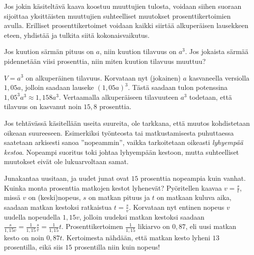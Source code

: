 Jos jokin käsiteltävä kaava koostuu muuttujien tulosta, voidaan siihen suoraan sijoittaa yksittäisten muuttujien suhteelliset muutokset prosenttikertoimien avulla. Erilliset prosenttikertoimet voidaan kaikki siirtää alkuperäisen lausekkeen eteen, yhdistää ja tulkita siitä kokonaisvaikutus.

\begin{esimerkki}
Jos kuution särmän pituus on $a$, niin kuution tilavuus on $a^3$. Jos jokaista särmää pidennetään viisi prosenttia, niin miten kuution tilavuus muuttuu?
	\begin{esimratk}
$V=a^3$ on alkuperäinen tilavuus. Korvataan nyt (jokainen) $a$ kasvaneella versiolla $1,05a$, jolloin saadaan lauseke $(1,05a)^3$. Tästä saadaan tulon potenssina $1,05^3a^3 \approx 1,158a^3$. Vertaamalla alkuperäiseen tilavuuteen $a^3$ todetaan, että tilavuus on kasvanut noin $15,8$ prosenttia. %
	\end{esimratk}
\end{esimerkki} %

Jos tehtävässä käsitellään useita suureita, ole tarkkana, että muutos kohdistetaan oikeaan suureeseen. Esimerkiksi työnteosta tai matkustamisesta puhuttaessa saatetaan arkisesti sanoa ''nopeammin'', vaikka tarkoitetaan oikeasti \textit{lyhyempää kestoa}. Nopeampi suoritus toki johtaa lyhyempään kestoon, mutta suhteelliset muutokset eivät ole lukuarvoltaan samat.

\begin{esimerkki}
Junakantaa uusitaan, ja uudet junat ovat $15$ prosenttia nopeampia kuin vanhat. Kuinka monta prosenttia matkojen kestot lyhenevät? Pyöritellen kaavaa $v=\frac{s}{t}$, missä $v$ on (keski)nopeus, $s$ on matkan pituus ja $t$ on matkaan kuluva aika, saadaan matkan kestoksi ratkaistua $t=\frac{s}{v}$. Korvataan nyt entinen nopeus $v$ uudella nopeudella $1,15v$, jolloin uudeksi matkan kestoksi saadaan $\frac{s}{1,15v}=\frac{1}{1,15}\frac{s}{v}=\frac{1}{1,15}t$. Prosenttikertoimen $\frac{1}{1,15}$ likiarvo on $0,87$, eli uusi matkan kesto on noin $0,87t$. Kertoimesta nähdään, että matkan kesto lyheni $13$ prosentilla, eikä siis $15$ prosentilla niin kuin nopeus!
\end{esimerkki}

